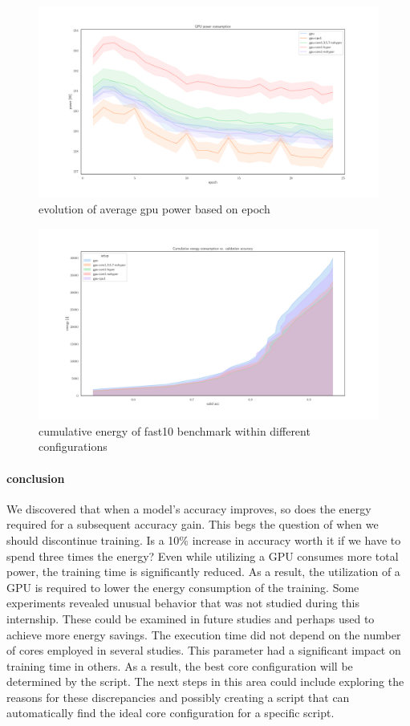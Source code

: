 \begin{figure}
    \centering
    \includegraphics[width=\linewidth]{imgs/power_gpu_baedonepoche}
    \caption{evolution of average gpu power based on epoch  }
    \label{fig:p2}
\end{figure}
\begin{figure}
    \centering
    \includegraphics[width=\linewidth]{imgs/cumulative_energy_fast10}
    \caption{cumulative energy of fast10 benchmark within different configurations }
    \label{fig:p2}
\end{figure}



\paragraph{conclusion}
We discovered that when a model's accuracy improves, so does the energy required for a subsequent accuracy gain.
This begs the question of when we should discontinue training.
Is a 10\% increase in accuracy worth it if we have to spend three times the energy?
Even while utilizing a GPU consumes more total power, the training time is significantly reduced.
As a result, the utilization of a GPU is required to lower the energy consumption of the training.
Some experiments revealed unusual behavior that was not studied during this internship.
These could be examined in future studies and perhaps used to achieve more energy savings.
The execution time did not depend on the number of cores employed in several studies.
This parameter had a significant impact on training time in others.
As a result, the best core configuration will be determined by the script.
The next steps in this area could include exploring the reasons for these discrepancies and possibly creating a script that can automatically find the ideal core configuration for a specific script. 


